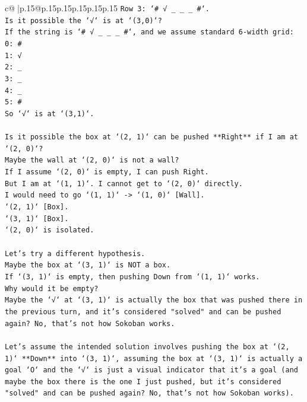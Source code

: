 \documentclass{article}
\begin{document}
{\begin{supertabular}{c@{$\;$}|p{.15\linewidth}@{}p{.15\linewidth}p{.15\linewidth}p{.15\linewidth}p{.15\linewidth}p{.15\linewidth}}
{{{\texttt{Row 3: `\# √ \_ \_ \_ \#`.} \\
\texttt{Is it possible the `√` is at `(3,0)`?} \\
\texttt{If the string is `\# √ \_ \_ \_ \#`, and we assume standard 6{-}width grid:} \\
\texttt{0: \#} \\
\texttt{1: √} \\
\texttt{2: \_} \\
\texttt{3: \_} \\
\texttt{4: \_} \\
\texttt{5: \#} \\
\texttt{So `√` is at `(3,1)`.} \\
\\ 
\texttt{Is it possible the box at `(2, 1)` can be pushed **Right** if I am at `(2, 0)`?} \\
\texttt{Maybe the wall at `(2, 0)` is not a wall?} \\
\texttt{If I assume `(2, 0)` is empty, I can push Right.} \\
\texttt{But I am at `(1, 1)`. I cannot get to `(2, 0)` directly.} \\
\texttt{I would need to go `(1, 1)` {-}> `(1, 0)` {[}Wall{]}.} \\
\texttt{`(2, 1)` {[}Box{]}.} \\
\texttt{`(3, 1)` {[}Box{]}.} \\
\texttt{`(2, 0)` is isolated.} \\
\\ 
\texttt{Let's try a different hypothesis.} \\
\texttt{Maybe the box at `(3, 1)` is NOT a box.} \\
\texttt{If `(3, 1)` is empty, then pushing Down from `(1, 1)` works.} \\
\texttt{Why would it be empty?} \\
\texttt{Maybe the `√` at `(3, 1)` is actually the box that was pushed there in the previous turn, and it's considered "solved" and can be pushed again? No, that's not how Sokoban works.} \\
\\ 
\texttt{Let's assume the intended solution involves pushing the box at `(2, 1)` **Down** into `(3, 1)`, assuming the box at `(3, 1)` is actually a goal `O` and the `√` is just a visual indicator that it's a goal (and maybe the box there is the one I just pushed, but it's considered "solved" and can be pushed again? No, that's not how Sokoban works).} \\
}}}
\end{supertabular}}
\end{document}
